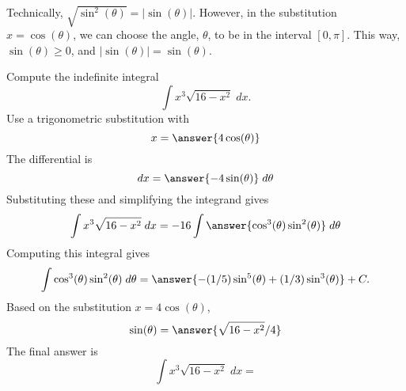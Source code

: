\documentclass{ximera}
\begin{document}
\begin{remark}
Technically, $\sqrt{\sin^2(\theta)} = |\sin(\theta)|$. However, in the substitution
$x = \cos(\theta)$, we can choose the angle, $\theta$, to be in the interval
$[0, \pi]$. This way, $\sin(\theta) \geq 0$, and $|\sin(\theta)| = \sin(\theta)$.
\end{remark}



\begin{problem}
Compute the indefinite integral
\[
\int   x^3 \sqrt{16-x^2} \; dx.
\]
Use a trigonometric substitution with\\
\[
x = \answer{4\cos(\theta)}
\]
The differential is\\
\[
dx = \answer{-4\sin(\theta)} \; d\theta
\]
Substituting these and simplifying the integrand gives\\
\[
\int   x^3\sqrt{16 - x^2}\; dx = -16\int \answer{\cos^3(\theta)\sin^2(\theta)} \; d\theta
\]
Computing this integral gives
\[
\int \cos^3(\theta)\sin^2(\theta) \; d\theta = \answer{-(1/5)\sin^5(\theta) + (1/3)\sin^3(\theta)} + C.
\]
Based on the substitution $x = 4\cos(\theta)$, \\
\[
\sin(\theta) = \answer{\sqrt{16 - x^2}/4}
\]
The final answer is
\[
\int   x^3\sqrt{16 -  x^2}\; dx = 
\]
\begin{center}
\begin{multipleChoice}
\end{multipleChoice}
\end{center}


\end{problem}
\end{document}
